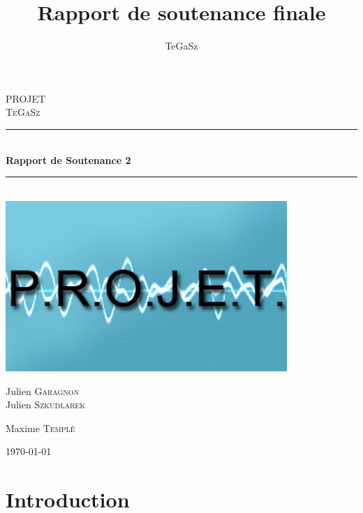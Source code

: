 \documentclass[12pt,a4paper]{report}
\title{Rapport de soutenance finale}
\date{}
\author{TeGaSz}
\newcommand{\HRule}{\rule{\linewidth}{0.5mm}}
\begin{document}
\begin{titlepage}



\begin{center}



\textsc{\LARGE PROJET}\\[1.5cm]

\textsc{\Large TeGaSz}\\[0.5cm]


\HRule \\[0.4cm]
{ \huge \bfseries Rapport de Soutenance 2}\\[0.4cm]
  
\HRule \\[1.5cm]
\includegraphics[width=0.8\textwidth]{./name.jpg}\\[1cm]  
\begin{minipage}{0.4\textwidth}
\begin{flushleft} \large
Julien \textsc{Garagnon}\\
Julien \textsc{Szkudlarek}
\end{flushleft}
\end{minipage}
\begin{minipage}{0.4\textwidth}
\begin{flushright} \large
Maxime \textsc{Templé}\\

\end{flushright}
\end{minipage}

\vfill

{\large \today}

\end{center}

\end{titlepage}
\tableofcontents


\chapter*{Introduction}
\end{document}
